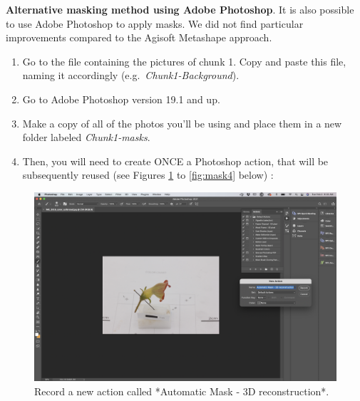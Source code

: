 \documentclass[
]{book}
\begin{document}
\textbf{Alternative masking method using Adobe Photoshop}. It is also possible
to use Adobe Photoshop to apply masks. We did not find particular
improvements compared to the Agisoft Metashape approach.

\begin{enumerate}
\def\labelenumi{\arabic{enumi}.}
\item
  Go to the file containing the pictures of chunk 1. Copy and paste
  this file, naming it accordingly (e.g.~\emph{Chunk1-Background}).
\item
  Go to Adobe Photoshop version 19.1 and up.
\item
  Make a copy of all of the photos you'll be using and place them in a
  new folder labeled \emph{Chunk1-masks}.
\item
  Then, you will need to create ONCE a Photoshop action, that will be
  subsequently reused (see Figures \ref{fig:mask1} to \ref{fig:mask4} below) :
\end{enumerate}

\begin{figure}

{\centering \includegraphics[width=1\linewidth]{Figures/mask_1} 

}

\caption{Record a new action called *Automatic Mask - 3D reconstruction*.}\label{fig:mask1}
\end{figure}
\end{document}
